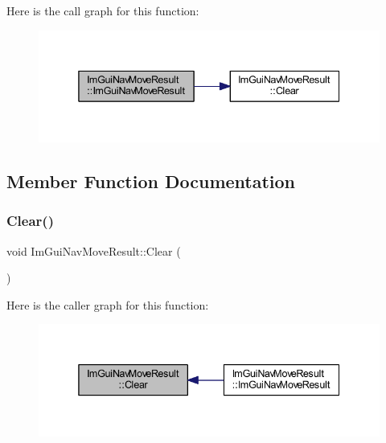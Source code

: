 Here is the call graph for this function\+:
\nopagebreak
\begin{figure}[H]
\begin{center}
\leavevmode
\includegraphics[width=338pt]{struct_im_gui_nav_move_result_a76bcc6d5bb813a8b9787bec50426cda2_cgraph}
\end{center}
\end{figure}


\subsection{Member Function Documentation}
\mbox{\label{struct_im_gui_nav_move_result_a5a357bf3bc46689eebec0f6dfdfd51ca}} 
\subsubsection{\texorpdfstring{Clear()}{Clear()}}
{\footnotesize\ttfamily void Im\+Gui\+Nav\+Move\+Result\+::\+Clear (\begin{DoxyParamCaption}{ }\end{DoxyParamCaption})\hspace{0.3cm}{\ttfamily [inline]}}

Here is the caller graph for this function\+:
\nopagebreak
\begin{figure}[H]
\begin{center}
\leavevmode
\includegraphics[width=338pt]{struct_im_gui_nav_move_result_a5a357bf3bc46689eebec0f6dfdfd51ca_icgraph}
\end{center}
\end{figure}


